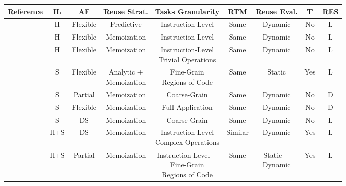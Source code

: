 \begin{table}[t!]
\begin{center}
\vspace*{-2ex}
\begin{scriptsize}
\begin{tabular}{ccccccccc}
\toprule

Reference       & IL         & AF & Reuse Strat. & Tasks Granularity                                & RTM & Reuse Eval. & T & RES \\

\midrule

\cite{reuse1} & H            & Flexible                   & Predictive          & Instruction-Level                                & Same       & Dynamic          & No             & L   \\
\cite{reuse2} & H            & Flexible                   & Memoization         & Instruction-Level                                & Same       & Dynamic          & No             & L   \\
\cite{reuse3} & H            & Flexible                   & Memoization         & \makecell{Instruction-Level \\ Trivial Operations}             & Same       & Dynamic          & No             & L   \\
\cite{reuse4} & S            & Flexible                   & \makecell{Analytic + \\ Memoization}  & \makecell{Fine-Grain \\ Regions of Code} & Same       & Static           & Yes            & L   \\
\cite{reuse5} & S            & Partial                 & Memoization         & Coarse-Grain                          & Same       & Dynamic          & No             & D   \\
\cite{reuse7} & S            & Flexible                   & Memoization         & Full Application                                  & Same       & Dynamic          & No           & D  \\
\cite{reuse8} & S            & DS                    & Memoization         & Coarse-Grain          & Same       & Dynamic          & No             & L   \\
\cite{reuse9}       & H+S & DS                    & Memoization         & \makecell{Instruction-Level \\ Complex Operations} & Similar             & Dynamic          & Yes            & L   \\
\cite{reuse10}       & H+S & Partial        & Memoization         & \makecell{Instruction-Level + \\ Fine-Grain \\ Regions of Code} & Same       & \makecell{Static + \\ Dynamic}          & Yes     & L  \\

\end{tabular}
\end{scriptsize}
\end{center}
\end{table}
